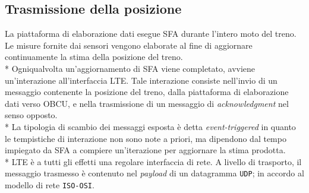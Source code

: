 	\subsection{Trasmissione della posizione}
	La piattaforma di elaborazione dati esegue SFA durante l'intero moto del treno. Le misure fornite dai sensori vengono elaborate al fine di aggiornare continuamente la stima della posizione del treno.\\*
	Ogniqualvolta un'aggiornamento di SFA viene completato, avviene un'interazione all'interfaccia LTE. Tale interazione consiste nell'invio di un messaggio contenente la posizione del treno, dalla piattaforma di elaborazione dati verso OBCU, e nella trasmissione di un messaggio di \emph{acknowledgment} nel senso opposto.\\*
	La tipologia di scambio dei messaggi esposta \`e detta \emph{event-triggered} \cite{evttimetriggered} in quanto le tempistiche di interazione non sono note a priori, ma dipendono dal tempo impiegato da SFA a compiere un'iterazione per aggiornare la stima prodotta.\\*
	LTE \`e a tutti gli effetti una regolare interfaccia di rete. A livello di trasporto, il messaggio trasmesso \`e contenuto nel \emph{payload} di un datagramma \texttt{UDP}; in accordo al modello di rete \texttt{ISO-OSI}. \cite{libroreti}

